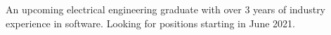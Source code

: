 


\begin{cvparagraph}


{An upcoming electrical engineering graduate with over 3 years of industry experience in software. Looking for positions starting in June 2021.}


\end{cvparagraph}
\vspace{-4mm}